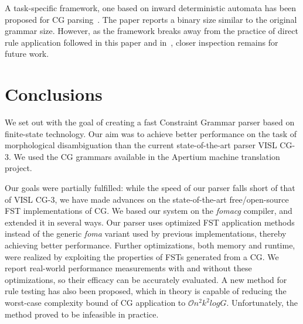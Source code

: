 \documentclass[11pt]{article}
\begin{document}
A task-specific framework, one based on inward deterministic automata has
been proposed for CG parsing~\cite{Yli-Jyra:2011}. The paper reports a binary
size similar to the original grammar size. However, as the framework breaks away
from the practice of direct rule application followed in this paper and
in~\cite{Hulden:2011,Peltonen:2011}, closer inspection remains for future work. 


\section{Conclusions}
\label{sec:conclusion}
We set out with the goal of creating a fast Constraint Grammar parser based on
finite-state technology. Our aim was to achieve better performance on the task
of morphological disambiguation than the current state-of-the-art parser
VISL CG-3. We used the CG grammars available in the Apertium machine translation
project.

Our goals were partially fulfilled: while the speed of our parser falls short
of that of VISL CG-3, we have made advances on the state-of-the-art
free/open-source FST implementations of CG. We based our system on the
\emph{fomacg} compiler, and extended it in several ways. Our parser  %
uses optimized FST application methods instead of the generic \emph{foma} variant
used by previous implementations, thereby achieving better performance.
Further optimizations, both memory and runtime, were realized
by exploiting the properties of FSTs generated from a CG. We report real-world
performance measurements with and without these optimizations, so their efficacy
can be accurately evaluated.
A new method for rule testing has also been proposed, which in theory is capable
of reducing the worst-case complexity bound of CG application to
$\mathcal{O}n^2k^2logG$. Unfortunately, the method proved to be infeasible in
practice.
\end{document}
